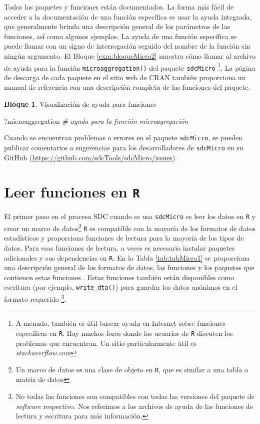 \documentclass[]{book}
\newenvironment{Shaded}{\begin{snugshade}}{\end{snugshade}}
\newcommand{\CommentTok}[1]{\textcolor[rgb]{0.56,0.35,0.01}{\textit{#1}}}
\newcommand{\NormalTok}[1]{#1}
\theoremstyle{definition}
\theoremstyle{definition}
\newtheorem{example}{Bloque}[chapter]
\theoremstyle{definition}
\theoremstyle{definition}
\theoremstyle{remark}
\begin{document}
Todos los paquetes y funciones están documentados. La forma más fácil de acceder a la documentación de una función específica es usar la ayuda integrada, que generalmente brinda una descripción general de los parámetros de las funciones, así como algunos ejemplos. La ayuda de una función específica se puede llamar con un signo de interrogación seguido del nombre de la función sin ningún argumento. El Bloque \ref{exm:bloqueMicro2} muestra cómo llamar al archivo de ayuda para la función \texttt{microaggregation()} del paquete \texttt{sdcMicro} \footnote{A menudo, también es útil buscar ayuda en Internet sobre funciones específicas en \texttt{R}. Hay muchos foros donde los usuarios de \texttt{R} discuten los problemas que encuentran. Un sitio particularmente útil es \emph{stackoverflow.com}}. La página de descarga de cada paquete en el sitio web de CRAN también proporciona un manual de referencia con una descripción completa de las funciones del paquete.

\begin{example}
\protect\hypertarget{exm:bloqueMicro2}{}{\label{exm:bloqueMicro2} }Visualización de ayuda para funciones
\end{example}

\begin{Shaded}
\begin{Highlighting}[]
\NormalTok{?microaggregation }\CommentTok{# ayuda para la función microagregación}
\end{Highlighting}
\end{Shaded}

Cuando se encuentran problemas o errores en el paquete \texttt{sdcMicro}, se pueden publicar comentarios o sugerencias para los desarrolladores de \texttt{sdcMicro} en su GitHub (\url{https://github.com/sdcTools/sdcMicro/issues}).

\hypertarget{leer-funciones-en-r}{%
\section{\texorpdfstring{Leer funciones en \texttt{R}}{Leer funciones en R}}\label{leer-funciones-en-r}}

El primer paso en el proceso SDC cuando se usa \texttt{sdcMicro} es leer los datos en \texttt{R} y crear un marco de datos\footnote{Un marco de datos es una clase de objeto en \texttt{R}, que es similar a una tabla o matriz de datos} \texttt{R} es compatible con la mayoría de los formatos de datos estadísticos y proporciona funciones de lectura para la mayoría de los tipos de datos. Para esas funciones de lectura, a veces es necesario instalar paquetes adicionales y sus dependencias en \texttt{R}. En la Tabla \ref{tab:tabMicro1} se proporciona una descripción general de los formatos de datos, las funciones y los paquetes que contienen estas funciones . Estas funciones también están disponibles como escritura (por ejemplo, \texttt{write\_dta()}) para guardar los datos anónimos en el formato requerido \footnote{No todas las funciones son compatibles con todas las versiones del paquete de \emph{software} respectivo. Nos referimos a los archivos de ayuda de las funciones de lectura y escritura para más información.}.
\end{document}

